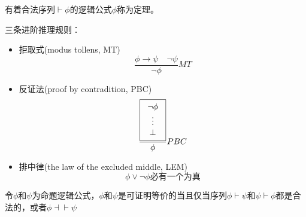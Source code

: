 \begin{definition}[定理(theorem)]
有着合法序列$\vdash\phi$的逻辑公式$\phi$称为定理。
\end{definition}

三条进阶推理规则：
\begin{itemize}
\item 拒取式(modus tollens, MT)
\[\frac{\phi\to\psi\quad \lnot\psi}{\lnot\phi} MT\]
\item 反证法(proof by contradition, PBC)
\[\frac{\fbox{\begin{tabular}{c}$\lnot\phi$\\$\vdots$\\$\bot$\end{tabular}}}{\phi} PBC\]
\item 排中律(the law of the excluded middle, LEM)
\[\phi\lor\lnot\phi\text{必有一个为真}\]
\end{itemize}

\begin{definition}
令$\phi$和$\psi$为命题逻辑公式，$\phi$和$\psi$是可证明等价的当且仅当序列$\phi\vdash\psi$和$\psi\vdash\phi$都是合法的，或者$\phi\dashv\vdash\psi$
\end{definition}